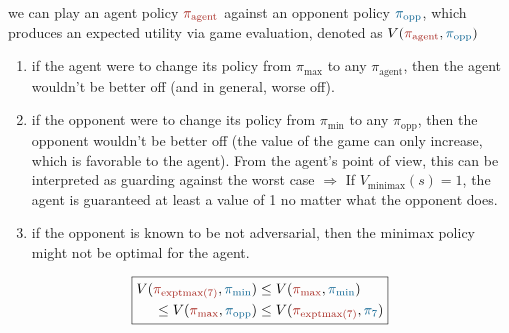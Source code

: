  we can play an agent policy
$\agentcolor{\pi_{\text{agent}}}$ against an opponent policy
$\oppcolor{\pi_{\text{opp}}}$, which produces an expected utility via game
evaluation, denoted as $V(\agentcolor{\pi_{\text{agent}}},
\oppcolor{\pi_{\text{opp}}})$\\
\begin{enumerate}
    \item if the agent were to change its policy from $\pi_{\text{max}}$ to any
        $\pi_{\text{agent}}$, then the agent wouldn't be better off (and in
        general, worse off). 
    \item if the opponent were to change its policy from $\pi_{\text{min}}$ to
        any $\pi_{\text{opp}}$, then the opponent wouldn't be better off (the
        value of the game can only increase, which is favorable to the agent).
        From the agent's point of view, this can be interpreted as guarding
        against the worst case $\Rightarrow$ If $V_{\text{minimax}}(s) = 1$, the
        agent is guaranteed at least a value of 1 no matter what the opponent
        does.
    \item if the opponent is known to be not adversarial, then the minimax
        policy might not be optimal for the agent.
\end{enumerate}
\begin{displaymath}
\boxed{
\begin{split}
V(\agentcolor{\pi_{\text{exptmax}(7)}}, \oppcolor{\pi_{\text{min}}}) &\le V(\agentcolor{\pi_{\text{max}}}, \oppcolor{\pi_{\text{min}}}) \\
\le V(\agentcolor{\pi_{\text{max}}}, \oppcolor{\pi_{\text{opp}}}) & \le V(\agentcolor{\pi_{\text{exptmax}(7)}}, \oppcolor{\pi_{\text{7}}})
\end{split}
}
\end{displaymath}

